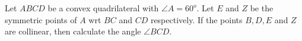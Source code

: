 Let $ABCD$ be a convex quadrilateral with $\angle A=60^o$. Let $E$ and $Z$ be the symmetric points of $A$ wrt $BC$ and $CD$ respectively. If the points $B,D,E$ and $Z$ are collinear, then calculate the angle $\angle BCD$.